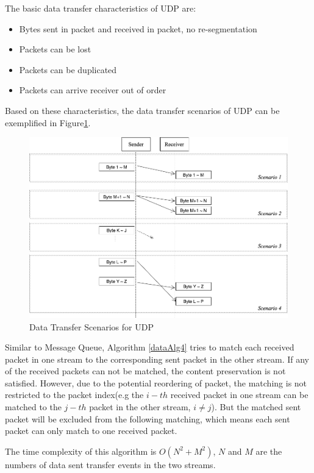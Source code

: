 The basic data transfer characteristics of UDP are:
\begin{itemize}
  \item Bytes sent in packet and received in packet, no re-segmentation
  \item Packets can be lost
  \item Packets can be duplicated
  \item Packets can arrive receiver out of order
\end{itemize}

Based on these characteristics, the data transfer scenarios of UDP can be exemplified in Figure\ref{upd}.
\begin{figure}[H]
\centerline{\includegraphics[scale=0.4]{Figures/udp}}
 \caption{Data Transfer Scenarios for UDP}
\label{upd}
\end{figure}

Similar to Message Queue, Algorithm \ref{dataAlg4} tries to match each received packet in one stream to the corresponding sent packet in the other stream. If any of the received packets can not be matched, the content preservation is not satisfied. However, due to the potential reordering of packet, the matching is not restricted to the packet index(e.g the $i-th$ received packet in one stream can be matched to the $j-th$ packet in the other stream, $i \neq j$). But the matched sent packet will be excluded from the following matching, which means each sent packet can only match to one received packet.

The time complexity of this algorithm is $O(N^2+M^2)$, $N$ and $M$ are the numbers of data sent transfer events in the two streams.

